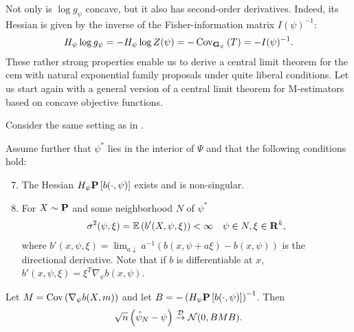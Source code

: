 Not only is $\log g_{\psi}$ concave, but it also has second-order derivatives. Indeed, its Hessian is given by the inverse of the Fisher-information matrix $I(\psi)^{-1}$:
$$
H_{\psi} \log g_{\psi} = - H_{\psi} \log Z (\psi) = - \cov_{\G_{\psi}} \left(T\right) = -I(\psi)^{-1}.
$$
These rather strong properties enable us to derive a central limit theorem for the \acrshort{cem} with natural exponential family proposals under quite liberal conditions.
Let us start again with a general version of a central limit theorem for M-estimators based on concave objective functions. 
\begin{theorem}
    Consider the same setting as in . 

    Assume further that $\psi^{\ast}$ lies in the interior of $\Psi$ and that the following conditions hold: 
    \begin{enumerate}[label=(C\arabic*),ref=(C\arabic*)]
        \setcounter{enumi}{6}
        \item\label{it:C7} The Hessian $H_{\psi} \P \left[ b(\cdot, \psi) \right]$ exists and is non-singular.
        \setcounter{enumi}{9}
        \item\label{it:C10} For $X\sim \P$ and some neighborhood $N$ of $\psi^{\ast}$ 
        \begin{align*}
            \sigma^{2}(\psi, \xi) = \mathbb E \left( b'(X, \psi, \xi)  \right) < \infty && \psi \in N, \xi \in \R^{k},
        \end{align*}
        where $b'(x, \psi, \xi) = \lim_{a \downarrow} a^{-1} \left( b(x, \psi + a\xi) - b(x, \psi)\right)$ is the directional derivative. Note that if $b$ is differentiable at $x$, $b'(x, \psi, \xi) = \xi^{T}\nabla_{\psi} b(x, \psi)$.
    \end{enumerate}
    
    Let $M = \cov \left( \nabla_{\psi} b(X, m) \right)$ and let $B = - \left(H_{\psi} \P \left[ b(\cdot, \psi) \right]\right)^{-1}$. Then 
    \begin{equation}
        \sqrt{n} \left( \hat\psi_{N} - \psi \right) \convD \Normal (0, BMB).
    \end{equation}
    
\end{theorem}



